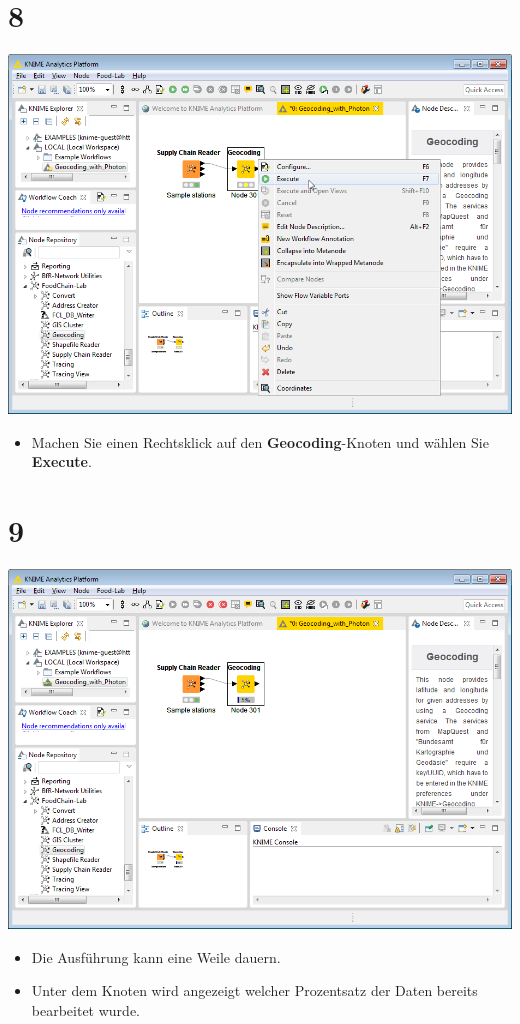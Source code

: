 \documentclass[10pt]{beamer}
\begin{document}
\section{8}
\begin{frame}
	\begin{center}
  		\includegraphics[height=0.6\textheight]{8.png}
	\end{center}
	\begin{itemize}
		\item Machen Sie einen Rechtsklick auf den \textbf{Geocoding}-Knoten und wählen Sie \textbf{Execute}.
	\end{itemize}
\end{frame}

\section{9}
\begin{frame}
	\begin{center}
  		\includegraphics[height=0.6\textheight]{9.png}
	\end{center}
	\begin{itemize}
		\item Die Ausführung kann eine Weile dauern.
		\item Unter dem Knoten wird angezeigt welcher Prozentsatz der Daten bereits bearbeitet wurde.
	\end{itemize}
\end{frame}
\end{document}
